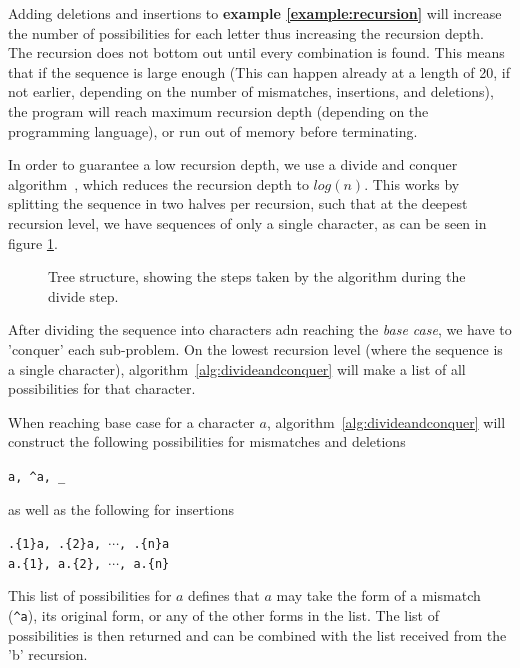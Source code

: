 \documentclass[12pt]{article}
\theoremstyle{definition}
\begin{document}
Adding deletions and insertions to \textbf{example \ref{example:recursion}} will increase the number of possibilities for each letter thus increasing the recursion depth. The recursion does not bottom out until every combination is found. This means that if the sequence is large enough (This can happen already at a length of 20, if not earlier, depending on the number of mismatches, insertions, and deletions), the program will reach maximum recursion depth (depending on the programming language), or run out of memory before terminating.

In order to guarantee a low recursion depth, we use a divide and conquer algorithm~\cite{Algorithms}, which reduces the recursion depth to $log(n)$. This works by splitting the sequence in two halves per recursion, such that at the deepest recursion level, we have sequences of only a single character, as can be seen in figure \ref{fig:tree_example}. 

\begin{figure}[H]
	\centering
	\caption{Tree structure, showing the steps taken by the algorithm during the divide step.}
	\label{fig:tree_example}
\end{figure}

After dividing the sequence into characters adn reaching the \emph{base case}, we have to 'conquer' each sub-problem. On the lowest recursion level (where the sequence is a single character), algorithm~\ref{alg:divideandconquer} will make a list of all possibilities for that character.

\begin{example}[label=example:possibilities]
When reaching base case for a character $a$, algorithm~\ref{alg:divideandconquer} will construct the following possibilities for mismatches and deletions

\begin{center}
	\texttt{a, \^{}a, \_}
\end{center}

\noindent as well as the following for insertions

\begin{center}
	\texttt{.\{1\}a, .\{2\}a, $\cdots$, .\{n\}a} \\
	\texttt{a.\{1\}, a.\{2\}, $\cdots$, a.\{n\}}
\end{center}

\noindent This list of possibilities for $a$ defines that $a$ may take the form of a mismatch (\texttt{\^{}a}), its original form, or any of the other forms in the list. The list of possibilities is then returned and can be combined with the list received from the 'b' recursion.
\end{example}
\end{document}
